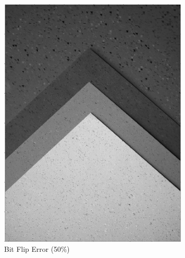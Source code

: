 \documentclass[landscape,a0paper,fontscale=0.5]{baposter} %
\begin{document}
\begin{poster}
{\begin{figure}[H]
\begin{subfigure}{0.2\textwidth}
		\includegraphics[scale=0.115]{7Pattern.jpg}
		\caption{Bit Flip Error (50\%)} %
	\end{subfigure}
	\begin{subfigure}{0.2\textwidth} %

\end{subfigure}
\end{figure}}
\end{poster}
\end{document}
